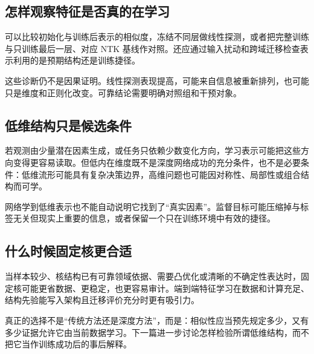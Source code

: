 \subsection{怎样观察特征是否真的在学习}

可以比较初始化与训练后表示的相似度，冻结不同层做线性探测，或者把完整训练与只训练最后一层、对应 NTK 基线作对照。还应通过输入扰动和跨域迁移检查表示利用的是预期结构还是训练捷径。

这些诊断仍不是因果证明。线性探测表现提高，可能来自信息被重新排列，也可能只是维度和正则化改变。可靠结论需要明确对照组和干预对象。

\subsection{低维结构只是候选条件}

若观测由少量潜在因素生成，或任务只依赖少数变化方向，学习表示可能把这些方向变得更容易读取。但低内在维度既不是深度网络成功的充分条件，也不是必要条件：低维流形可能具有复杂决策边界，高维问题也可能因对称性、局部性或组合结构而可学。

网络学到低维表示也不能自动说明它找到了``真实因素''。监督目标可能压缩掉与标签无关但现实上重要的信息，或者保留一个只在训练环境中有效的捷径。

\subsection{什么时候固定核更合适}

当样本较少、核结构已有可靠领域依据、需要凸优化或清晰的不确定性表达时，固定核可能更省数据、更稳定，也更容易审计。端到端特征学习在数据和计算充足、结构先验能写入架构且迁移评价充分时更有吸引力。

真正的选择不是``传统方法还是深度方法''，而是：相似性应当预先规定多少，又有多少证据允许它由当前数据学习。下一篇进一步讨论怎样检验所谓低维结构，而不把它当作训练成功后的事后解释。

